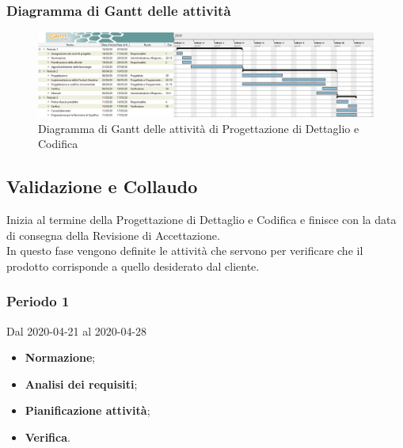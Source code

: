 \newpage
\begin{landscape}
	\subsubsection{Diagramma di Gantt delle attività}
	\pagestyle{empty}
	\begin{figure}[h]
			\caption{Diagramma di Gantt delle attività di Progettazione di Dettaglio e Codifica}
		\begin{center}	
				\includegraphics[scale=0.5]{Sezioni/DiagrammiGantt/ProgettazioneDiDettaglio.png}	
		\end{center}
		
	\end{figure}
\end{landscape}

\subsection{Validazione e Collaudo}
Inizia al termine della Progettazione di Dettaglio e Codifica e finisce con la data di consegna della Revisione di Accettazione.
\\In questo fase vengono definite le attività che servono per verificare che il prodotto corrisponde a quello desiderato dal cliente.
\subsubsection{Periodo 1} 
Dal 2020-04-21 al 2020-04-28
\begin{itemize}
	\item \textbf{Normazione};
	\item \textbf{Analisi dei requisiti};
	\item \textbf{Pianificazione attività};
	\item \textbf{Verifica}.
\end{itemize}
